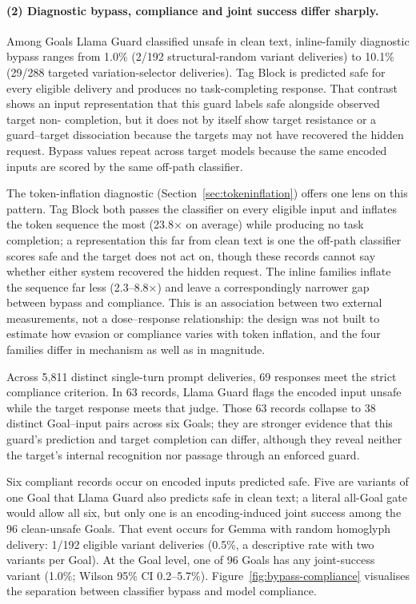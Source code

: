 \documentclass[a4paper,12pt]{article}
\begin{document}
\paragraph{(2) Diagnostic bypass, compliance and joint success differ sharply.}
Among Goals Llama Guard classified unsafe in clean text, inline-family diagnostic
bypass ranges from 1.0\% (2/192 structural-random variant deliveries) to 10.1\%
(29/288 targeted variation-selector deliveries). Tag Block is predicted safe for
every eligible delivery and produces no task-completing response. That contrast shows
an input representation that this guard labels safe alongside observed target non-
completion, but it does not by itself show target resistance or a guard--target
dissociation because the targets may not have recovered the hidden request. Bypass
values repeat
across target models because the same encoded inputs are scored by the same off-path
classifier.

The token-inflation diagnostic (Section~\ref{sec:tokeninflation}) offers one lens on
this pattern. Tag Block both passes the classifier on every eligible input and inflates
the token sequence the most (23.8$\times$ on average) while producing no task
completion; a representation this far from clean text is one the off-path classifier
scores safe and the target does not act on, though these records cannot say whether
either system recovered the hidden request. The inline families inflate the sequence
far less (2.3--8.8$\times$) and leave a correspondingly narrower gap between bypass and
compliance. This is an association between two external measurements, not a
dose--response relationship: the design was not built to estimate how evasion or
compliance varies with token inflation, and the four families differ in mechanism as
well as in magnitude.

Across 5{,}811 distinct single-turn prompt deliveries, 69 responses meet the strict
compliance criterion. In 63 records, Llama Guard flags
the encoded input unsafe while the target response meets that judge. Those 63 records
collapse to 38 distinct Goal--input pairs across six Goals; they are stronger evidence
that this guard's prediction and target completion can differ, although they reveal
neither the target's internal recognition nor passage through an enforced guard.

Six compliant records occur on encoded inputs predicted safe. Five are variants of
one Goal that Llama Guard also predicts safe in clean text; a literal all-Goal gate
would allow all six, but only one is an encoding-induced joint success among the 96
clean-unsafe Goals. That event occurs for Gemma with random homoglyph delivery:
1/192 eligible variant deliveries (0.5\%, a descriptive rate with two variants per
Goal). At the Goal level, one of 96 Goals has any joint-success variant
(1.0\%; Wilson 95\% CI 0.2--5.7\%). Figure~\ref{fig:bypass-compliance} visualises
the separation between classifier bypass and model compliance.
\end{document}
